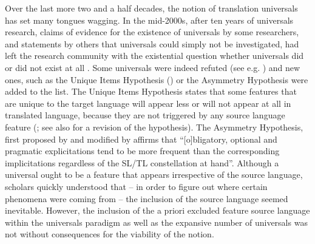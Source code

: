Over the last more two and a half decades, the notion of translation universals has set many tongues wagging. In the mid-2000s, after ten years of universals research, claims of evidence for the existence of universals by some researchers, and statements by others that universals could simply not be investigated, had left the research community with the existential question whether universals did or did not exist at all  \citep[1]{Mauranen2004}. Some universals were indeed refuted (see e.g. \citealt{becher_abandoning_2010}) and new ones, such as the Unique Items Hypothesis  (\citealt{mauranen_unique_2004}) or the Asymmetry Hypothesis \citep{dimitriu_asymmetry_2009} were added to the list. The Unique Items Hypothesis states that some features that are unique to the target language will appear less or will not appear at all in translated language, because they are not triggered by any source language feature  (\citealt{mauranen_unique_2004}; see also \citealt{gambier_what_2004} for a revision of the hypothesis). The Asymmetry Hypothesis, first proposed by \citet{dimitriu_asymmetry_2009} and modified by \citet{becher_abandoning_2010} affirms that “[o]bligatory, optional and pragmatic explicitations tend to be more frequent than the corresponding implicitations regardless of the SL/TL constellation at hand”. Although a universal ought to be a feature that appears irrespective of the source language, scholars quickly understood that – in order to figure out where certain phenomena were coming from – the inclusion of the source language seemed inevitable. However, the inclusion of the a priori excluded feature source language within the universals paradigm as well as the expansive number of universals was not without consequences for the viability of the notion. 



